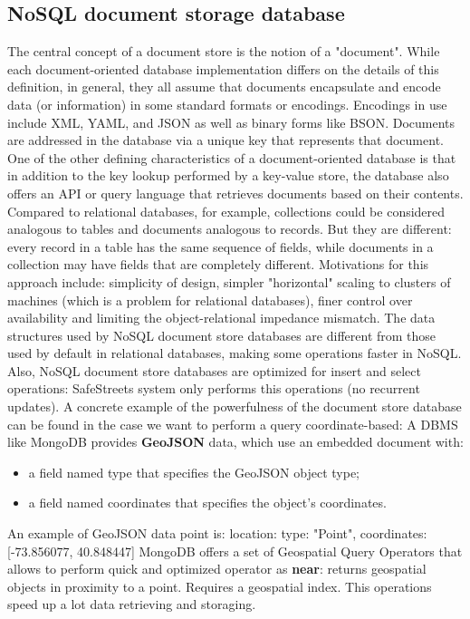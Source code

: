\subsection{NoSQL document storage database}
The central concept of a document store is the notion of a "document". While each document-oriented database implementation differs on the details of this definition, in general, they all assume that documents encapsulate and encode data (or information) in some standard formats or encodings. Encodings in use include XML, YAML, and JSON as well as binary forms like BSON. Documents are addressed in the database via a unique key that represents that document. One of the other defining characteristics of a document-oriented database is that in addition to the key lookup performed by a key-value store, the database also offers an API or query language that retrieves documents based on their contents.
\newline
Compared to relational databases, for example, collections could be considered analogous to tables and documents analogous to records. But they are different: every record in a table has the same sequence of fields, while documents in a collection may have fields that are completely different. 
\newline
Motivations for this approach include: simplicity of design, simpler "horizontal" scaling to clusters of machines (which is a problem for relational databases), finer control over availability and limiting the object-relational impedance mismatch. The data structures used by NoSQL document store databases are different from those used by default in relational databases, making some operations faster in NoSQL. 
Also, NoSQL document store databases are optimized for insert and select operations: SafeStreets system only performs this operations (no recurrent updates).
\newline
A concrete example of the powerfulness of the document store database can be found in the case we want to perform a query coordinate-based: A DBMS like MongoDB provides \textbf{GeoJSON} data, which use an embedded document with:
\begin{itemize}
    \item a field named type that specifies the GeoJSON object type;
    \item a field named coordinates that specifies the object’s coordinates.
\end{itemize}
An example of GeoJSON data point is:\newline
location: {
      type: "Point",
      coordinates: [-73.856077, 40.848447]
}
\newline
MongoDB offers a set of Geospatial Query Operators that allows to perform quick and optimized operator as \textbf{near}: returns geospatial objects in proximity to a point. Requires a geospatial index. \newline
This operations speed up a lot data retrieving and storaging.
